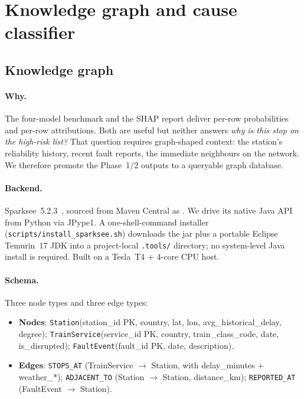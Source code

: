 \section{Knowledge graph and cause classifier}
\label{sec:kgcause}

\subsection{Knowledge graph}

\paragraph{Why.} The four-model benchmark and the SHAP report deliver per-row probabilities and per-row attributions. Both are useful but neither answers \emph{why is this stop on the high-risk list?} That question requires graph-shaped context: the station's reliability history, recent fault reports, the immediate neighbours on the network. We therefore promote the Phase~1/2 outputs to a queryable graph database.

\paragraph{Backend.} Sparksee~5.2.3~\cite{sparksee2024,martinez2017dex}, sourced from Maven Central as \texttt{}. We drive its native Java API from Python via JPype1. A one-shell-command installer (\texttt{scripts/install\_sparksee.sh}) downloads the jar plus a portable Eclipse Temurin~17 JDK into a project-local \texttt{.tools/} directory; no system-level Java install is required. Built on a Tesla~T4 + 4-core CPU host.

\paragraph{Schema.} Three node types and three edge types:
\begin{itemize}
    \item \textbf{Nodes}: \texttt{Station}(station\_id PK, country, lat, lon, avg\_historical\_delay, degree); \texttt{TrainService}(service\_id PK, country, train\_class\_code, date, is\_disrupted); \texttt{FaultEvent}(fault\_id PK, date, description).
    \item \textbf{Edges}: \texttt{STOPS\_AT} (TrainService $\to$ Station, with delay\_minutes + weather\_*); \texttt{ADJACENT\_TO} (Station $\to$ Station, distance\_km); \texttt{REPORTED\_AT} (FaultEvent $\to$ Station).
\end{itemize}

